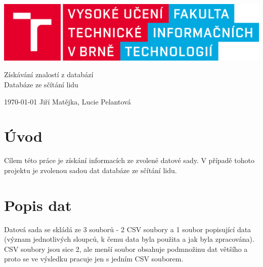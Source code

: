 \documentclass[11pt,a4paper,titlepage]{article}
\begin{document}
		\begin{center}

			\includegraphics[width = 150mm]{logo.png}\\


			\LARGE
			Získávání znalostí z databází\\
			Databáze ze sčítání lidu\\

		\end{center}

	\Large{\today} \hfill Jiří Matějka, Lucie Pelantová
	\thispagestyle{empty}
	\newpage
	\setcounter{page}{1}

    \section{Úvod}
        Cílem této práce je získání informacích ze zvolené datové sady. V případě tohoto projektu
        je zvolenou sadou dat databáze ze sčítání lidu.
    
    \section{Popis dat}
        Datová sada se skládá ze 3 souborů - 2 CSV soubory a 1 soubor popisující data (význam
        jednotlivých sloupců, k čemu data byla použita a jak byla zpracována). CSV soubory jsou sice 2,
        ale menší soubor obsahuje podmnožinu dat většího a proto se ve výsledku pracuje jen s jedním CSV souborem.
        
\end{document}
